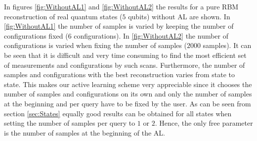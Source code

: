 \documentclass[pra,aps,showpacs,groupedaddress,superscriptaddress,twocolumn,toc=flat,biblatex,footinbib]{revtex4-1}
\begin{document}
In figures \ref{fig:WithoutAL1} and \ref{fig:WithoutAL2} the results for a pure RBM reconstruction of real quantum states ($5$ qubits) without AL are shown. In \ref{fig:WithoutAL1} the number of samples is varied by keeping the number of configurations fixed ($6$ configurations). In \ref{fig:WithoutAL2} the number of configurations is varied when fixing the number of samples ($2000$ samples). It can be seen that it is difficult and very time consuming to find the most efficient set of measurements and configurations by such scans. Furthermore, the number of samples and configurations with the best reconstruction varies from state to state. This makes our active learning scheme very appreciable since it chooses the number of samples and configurations on its own and only the number of samples at the beginning and per query have to be fixed by the user. As can be seen from section \ref{sec:States} equally good results can be obtained for all states when setting the number of samples per query to $1$ or $2$. Hence, the only free parameter is the number of samples at the beginning of the AL.  



\end{document}
